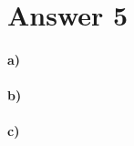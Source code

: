 \documentclass[12pt]{article}
\newcommand{\+}{\mkern2mu}
\begin{document}
\section*{Answer 5}
\paragraph{a)}
\paragraph{b)}
\paragraph{c)}
\end{document}
